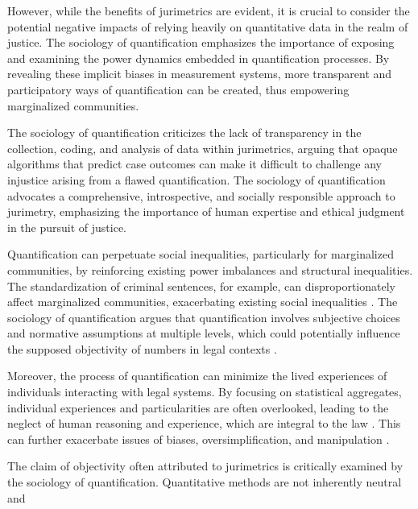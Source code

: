 However, while the benefits of jurimetrics are evident, it is crucial to consider the potential negative impacts of relying heavily on quantitative data in the realm of justice. The sociology of quantification emphasizes the importance of exposing and examining the power dynamics embedded in quantification processes. By revealing these implicit biases in measurement systems, more transparent and participatory ways of quantification can be created, thus empowering marginalized communities.

The sociology of quantification criticizes the lack of transparency in the collection, coding, and analysis of data within jurimetrics, arguing that opaque algorithms that predict case outcomes can make it difficult to challenge any injustice arising from a flawed quantification. The sociology of quantification advocates a comprehensive, introspective, and socially responsible approach to jurimetry, emphasizing the importance of human expertise and ethical judgment in the pursuit of justice.

Quantification can perpetuate social inequalities, particularly for marginalized communities, by reinforcing existing power imbalances and structural inequalities. The standardization of criminal sentences, for example, can disproportionately affect marginalized communities, exacerbating existing social inequalities \cite{10.1007/s11186-021-09453-1,de2010jurimetrics}. The sociology of quantification argues that quantification involves subjective choices and normative assumptions at multiple levels, which could potentially influence the supposed objectivity of numbers in legal contexts \cite{10.1007/s11186-021-09453-1,de2010jurimetrics}.

Moreover, the process of quantification can minimize the lived experiences of individuals interacting with legal systems. By focusing on statistical aggregates, individual experiences and particularities are often overlooked, leading to the neglect of human reasoning and experience, which are integral to the law \cite{10.1007/s11186-021-09453-1,de2010jurimetrics}. This can further exacerbate issues of biases, oversimplification, and manipulation \cite{10.1007/s11186-021-09453-1,de2010jurimetrics}.

The claim of objectivity often attributed to jurimetrics is critically examined by the sociology of quantification. Quantitative methods are not inherently neutral and


